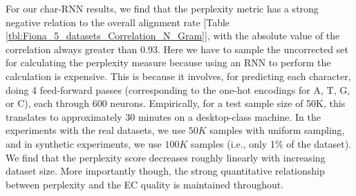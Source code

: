 For our char-RNN results, we find that the perplexity metric has a strong negative relation to the overall alignment rate [Table \ref{tbl:Fiona_5_datasets_Correlation_N_Gram}], with the absolute value of the correlation always greater than 0.93.
Here we have to sample the uncorrected set for calculating the perplexity measure because using an RNN to perform the calculation is expensive. This is because it involves, for predicting each character, doing 4 feed-forward passes (corresponding to the one-hot encodings for A, T, G, or C), each through 600 neurons. Empirically, for a test sample size of 50K, this translates to approximately 30 minutes on a desktop-class machine.  
In the experiments with the real datasets, we use $50K$ samples with uniform sampling, and in synthetic experiments, we use $100K$ samples (i.e., only 1\% of the dataset).
We find that the perplexity score decreases roughly linearly with increasing dataset size.
More importantly though, the strong quantitative relationship between perplexity and the EC quality is maintained throughout.


